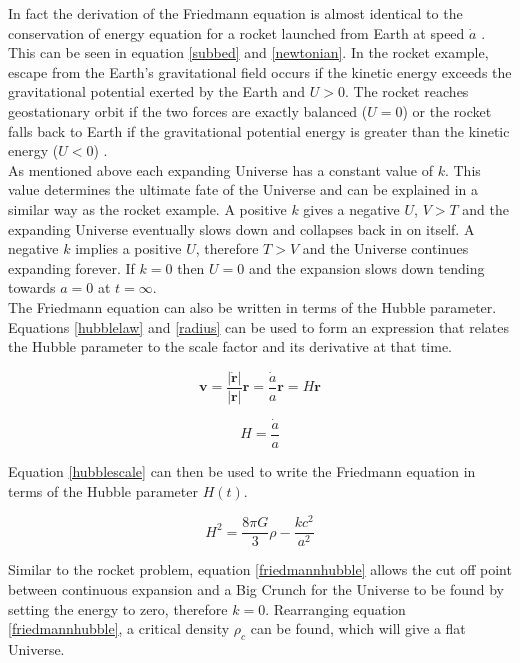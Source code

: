 \documentclass[12pt]{article} %
\begin{document}
In fact the derivation of the Friedmann equation is almost identical to the conservation of energy equation for a rocket launched from Earth at speed $\dot a$ \cite{carlo}. This can be seen in equation \ref{subbed} and \ref{newtonian}. In the rocket example, escape from the Earth's gravitational field occurs if the kinetic energy exceeds the gravitational potential exerted by the Earth and $U>0$. The rocket reaches geostationary orbit if the two forces are exactly balanced ($U = 0$) or the rocket falls back to Earth if the gravitational potential energy is greater than the kinetic energy ($U<0$) \cite{mukhanov}.\\

As mentioned above each expanding Universe has a constant value of $k$. This value determines the ultimate fate of the Universe and can be explained in a similar way as the rocket example. A positive $k$ gives a negative $U$, $V>T$ and the expanding Universe eventually slows down and collapses back in on itself. A negative $k$ implies a positive $U$, therefore $T>V$ and the Universe continues expanding forever. If $k = 0$ then $U = 0$ and the expansion slows down tending towards $a=0$ at $t=\infty$.\\

The Friedmann equation can also be written in terms of the Hubble parameter. Equations \ref{hubblelaw} and \ref{radius} can be used to form an expression that relates the Hubble parameter to the scale factor and its derivative at that time.

\begin{equation}\label{hubblevec}
\bm{v} = \frac{|\bm{\dot r}|}{|\bm{r}|}\bm{r} = \frac{\dot a}{a}\bm{r} = H \bm{r}
\end{equation}

\begin{equation}\label{hubblescale}
H = \frac{\dot a}{a}
\end{equation}

Equation \ref{hubblescale} can then be used to write the Friedmann equation in terms of the Hubble parameter $H(t)$.

\begin{equation}\label{friedmannhubble}
H^2 =  \frac{8\pi G}{3}\rho - \frac{k c^2}{a^2} 
\end{equation}

Similar to the rocket problem, equation \ref{friedmannhubble} allows the cut off point between continuous expansion and a Big Crunch for the Universe to be found by setting the energy to zero, therefore $k=0$. Rearranging equation \ref{friedmannhubble}, a critical density $\rho_{c}$ can be found, which will give a flat Universe.\\
\end{document}
